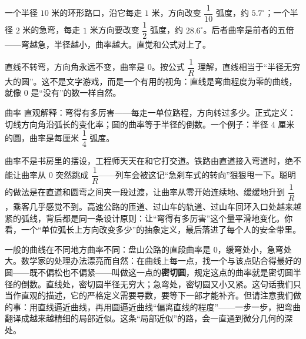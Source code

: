 \begin{li}
一个半径 $10$ 米的环形路口，沿它每走 $1$ 米，方向改变 $\dfrac{1}{10}$ 弧度，约 $5.7^\circ$；一个半径 $2$ 米的急弯，每走 $1$ 米方向要改变 $\dfrac{1}{2}$ 弧度，约 $28.6^\circ$。后者曲率是前者的五倍——弯越急，半径越小，曲率越大。直觉和公式对上了。
\end{li}

\begin{center}
\end{center}

\begin{zhu}
直线不转弯，方向角永远不变，曲率是 $0$。按公式 $\dfrac{1}{R}$ 理解，直线相当于``半径无穷大的圆''。这不是文字游戏，而是一个有用的视角：直线是弯曲程度为零的曲线，就像 $0$ 是``没有''的数一样自然。
\end{zhu}

\begin{shuyu}{曲率}
直观解释：弯得有多厉害——每走一单位路程，方向转过多少。正式定义：切线方向角沿弧长的变化率；圆的曲率等于半径的倒数。一个例子：半径 $4$ 厘米的圆，曲率是每厘米 $\dfrac{1}{4}$ 弧度。
\end{shuyu}

曲率不是书房里的摆设，工程师天天在和它打交道。铁路由直道接入弯道时，绝不能让曲率从 $0$ 突然跳成 $\dfrac{1}{R}$——列车会被这记``急刹车式的转向''狠狠甩一下。聪明的做法是在直道和圆弯之间夹一段过渡，让曲率从零开始连续地、缓缓地升到 $\dfrac{1}{R}$，乘客几乎感觉不到。高速公路的匝道、过山车的轨道、过山车回环入口处越来越紧的弧线，背后都是同一条设计原则：让``弯得有多厉害''这个量平滑地变化。你看，一个``单位弧长上方向改变多少''的抽象定义，最后落进了每个人的安全带里。

一般的曲线在不同地方曲率不同：盘山公路的直段曲率是 $0$，缓弯处小，急弯处大。数学家的处理办法漂亮而自然：在曲线上每一点，找一个与该点贴合得最好的圆——既不偏松也不偏紧——叫做这一点的\textbf{密切圆}，规定这点的曲率就是密切圆半径的倒数。直线处，密切圆半径无穷大；急弯处，密切圆又小又紧。这句话我们只当作直观的描述，它的严格定义需要导数，要等下一部才能补齐。但请注意我们做的事：用直线逼近曲线，再用圆逼近曲线``偏离直线的程度''——一步一步，把弯曲翻译成越来越精细的局部近似。这条``局部近似''的路，会一直通到微分几何的深处。


